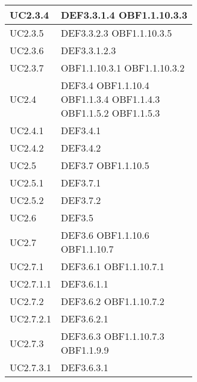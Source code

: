 \documentclass{scalatekids-article}
\begin{document}
\begin{longtable}[H]{|p{5.5cm}|p{5.5cm}|}
  \hline
  UC2.3.4 & \multiLineCell[t]{DEF3.3.1.4 OBF1.1.10.3.3\\}\\
  \hline
  UC2.3.5 & \multiLineCell[t]{DEF3.3.2.3 OBF1.1.10.3.5\\}\\
  \hline
  UC2.3.6 & \multiLineCell[t]{DEF3.3.1.2.3\\}\\
  \hline
  UC2.3.7 & \multiLineCell[t]{OBF1.1.10.3.1 OBF1.1.10.3.2\\}\\
  \hline
  UC2.4 & \multiLineCell[t]{DEF3.4 OBF1.1.10.4\\OBF1.1.3.4 OBF1.1.4.3\\OBF1.1.5.2 OBF1.1.5.3\\}\\
  \hline
  UC2.4.1 & \multiLineCell[t]{DEF3.4.1\\}\\
  \hline
  UC2.4.2 & \multiLineCell[t]{DEF3.4.2\\}\\
  \hline
  UC2.5 & \multiLineCell[t]{DEF3.7 OBF1.1.10.5\\}\\
  \hline
  UC2.5.1 & \multiLineCell[t]{DEF3.7.1\\}\\
  \hline
  UC2.5.2 & \multiLineCell[t]{DEF3.7.2\\}\\
  \hline
  UC2.6 & \multiLineCell[t]{DEF3.5\\}\\
  \hline
  UC2.7 & \multiLineCell[t]{DEF3.6 OBF1.1.10.6\\OBF1.1.10.7\\}\\
  \hline
  UC2.7.1 & \multiLineCell[t]{DEF3.6.1 OBF1.1.10.7.1\\}\\
  \hline
  UC2.7.1.1 & \multiLineCell[t]{DEF3.6.1.1\\}\\
  \hline
  UC2.7.2 & \multiLineCell[t]{DEF3.6.2 OBF1.1.10.7.2\\}\\
  \hline
  UC2.7.2.1 & \multiLineCell[t]{DEF3.6.2.1\\}\\
  \hline
  UC2.7.3 & \multiLineCell[t]{DEF3.6.3 OBF1.1.10.7.3\\OBF1.1.9.9}\\
  \hline
  UC2.7.3.1 & \multiLineCell[t]{DEF3.6.3.1\\}\\

\end{longtable}
\end{document}
